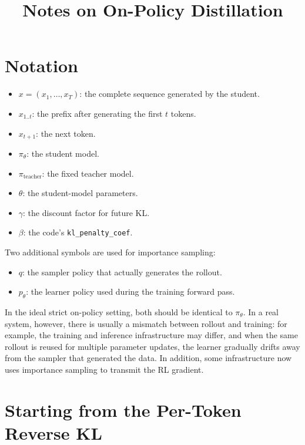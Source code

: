 \documentclass[11pt,a4paper]{article}
\title{Notes on On-Policy Distillation}
\author{}
\date{}
\begin{document}
\maketitle
\tableofcontents
\newpage

\section{Notation}

\begin{itemize}[leftmargin=2em]
    \item $x=(x_1,\ldots,x_T)$: the complete sequence generated by the student.
    \item $x_{1..t}$: the prefix after generating the first $t$ tokens.
    \item $x_{t+1}$: the next token.
    \item $\pi_\theta$: the student model.
    \item $\pi_{\text{teacher}}$: the fixed teacher model.
    \item $\theta$: the student-model parameters.
    \item $\gamma$: the discount factor for future KL.
    \item $\beta$: the code's \texttt{kl\_penalty\_coef}.
\end{itemize}

Two additional symbols are used for importance sampling:

\begin{itemize}[leftmargin=2em]
    \item $q$: the sampler policy that actually generates the rollout.
    \item $p_\theta$: the learner policy used during the training forward pass.
\end{itemize}

In the ideal strict on-policy setting, both should be identical to $\pi_\theta$. In a real system, however, there is usually a mismatch between rollout and training: for example, the training and inference infrastructure may differ, and when the same rollout is reused for multiple parameter updates, the learner gradually drifts away from the sampler that generated the data. In addition, some infrastructure now uses importance sampling to transmit the RL gradient.

\section{Starting from the Per-Token Reverse KL}
\end{document}
